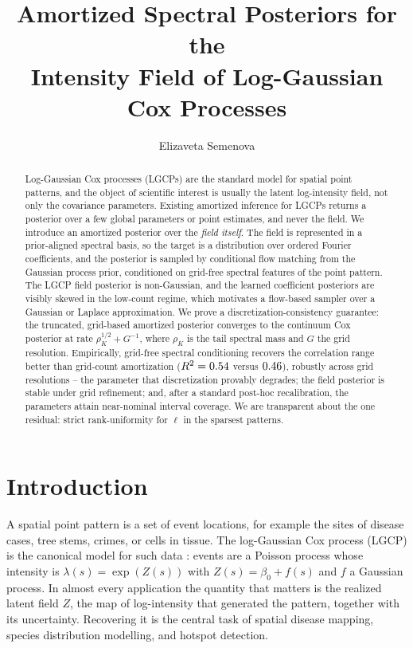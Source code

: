 \documentclass[10pt,twocolumn]{article}
\title{\bfseries Amortized Spectral Posteriors for the\\ Intensity Field of Log-Gaussian Cox Processes}
\author{Elizaveta Semenova}
\date{}
\begin{document}

\begin{abstract}
\noindent
Log-Gaussian Cox processes (LGCPs) are the standard model for spatial point
patterns, and the object of scientific interest is usually the latent
log-intensity field, not only the covariance parameters. Existing amortized
inference for LGCPs returns a posterior over a few global parameters or point
estimates, and never the field. We introduce an amortized posterior over the
\emph{field itself}. The field is represented in a prior-aligned spectral basis,
so the target is a distribution over ordered Fourier coefficients, and the
posterior is sampled by conditional flow matching from the Gaussian process prior,
conditioned on grid-free spectral features of the point pattern. The LGCP field
posterior is non-Gaussian, and the learned coefficient posteriors are visibly
skewed in the low-count regime, which motivates a flow-based sampler over a
Gaussian or Laplace approximation. We prove a discretization-consistency
guarantee: the truncated, grid-based amortized posterior converges to the
continuum Cox posterior at rate $\rho_K^{1/2}+G^{-1}$, where $\rho_K$ is the tail
spectral mass and $G$ the grid resolution. Empirically, grid-free spectral
conditioning recovers the correlation range better than grid-count amortization
($R^2=0.54$ versus $0.46$), robustly across grid resolutions --
the parameter that discretization provably degrades; the field posterior is stable
under grid refinement; and, after a standard post-hoc recalibration, the
parameters attain near-nominal interval coverage. We are transparent about the one
residual: strict rank-uniformity for $\ell$ in the sparsest patterns.
\end{abstract}

\section{Introduction}

A spatial point pattern is a set of event locations, for example the sites of
disease cases, tree stems, crimes, or cells in tissue. The log-Gaussian Cox
process (LGCP) is the canonical model for such data \citep{moller1998log}: events
are a Poisson process whose intensity is $\lambda(s)=\exp(Z(s))$ with
$Z(s)=\beta_0+f(s)$ and $f$ a Gaussian process. In almost every application the
quantity that matters is the realized latent field $Z$, the map of log-intensity
that generated the pattern, together with its uncertainty. Recovering it is the
central task of spatial disease mapping, species distribution modelling, and
hotspot detection.
\end{document}
